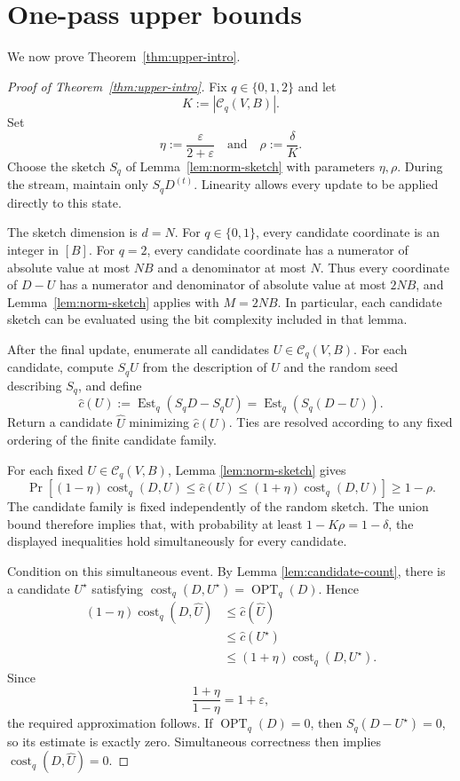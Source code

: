 \documentclass[11pt]{article}
\theoremstyle{definition}
\newcommand{\OPT}{\operatorname{OPT}}
\newcommand{\cost}{\operatorname{cost}}
\newcommand{\Est}{\operatorname{Est}}
\begin{document}
\section{One-pass upper bounds}\label{sec:upper}

We now prove Theorem~\ref{thm:upper-intro}.

\begin{proof}[Proof of Theorem~\ref{thm:upper-intro}]
Fix \(q\in\{0,1,2\}\) and let
\[
 K:=|\mathcal C_q(V,B)|.
\]
Set
\[
 \eta:=\frac{\varepsilon}{2+\varepsilon}
 \quad\text{and}\quad
 \rho:=\frac{\delta}{K}.
\]
Choose the sketch \(S_q\) of Lemma~\ref{lem:norm-sketch} with parameters
\(\eta,\rho\).  During the stream, maintain only \(S_qD^{(t)}\).  Linearity
allows every update to be applied directly to this state.

The sketch dimension is \(d=N\).  For \(q\in\{0,1\}\), every candidate
coordinate is an integer in \([B]\).  For \(q=2\), every candidate coordinate
has a numerator of absolute value at most \(NB\) and a denominator at most
\(N\).  Thus every coordinate of \(D-U\) has a numerator and denominator of
absolute value at most \(2NB\), and Lemma~\ref{lem:norm-sketch} applies with
\(M=2NB\).  In particular, each candidate sketch can be evaluated using the
bit complexity included in that lemma.

After the final update, enumerate all candidates
\(U\in\mathcal C_q(V,B)\).  For each candidate, compute \(S_qU\) from the
description of \(U\) and the random seed describing \(S_q\), and define
\[
 \widehat c(U):=\Est_q(S_qD-S_qU)
               =\Est_q(S_q(D-U)).
\]
Return a candidate \(\widehat U\) minimizing \(\widehat c(U)\).  Ties are
resolved according to any fixed ordering of the finite candidate family.

For each fixed \(U\in\mathcal C_q(V,B)\), Lemma
\ref{lem:norm-sketch} gives
\[
 \Pr\left[
 (1-\eta)\cost_q(D,U)
 \le\widehat c(U)\le
 (1+\eta)\cost_q(D,U)
 \right]\ge1-\rho.
\]
The candidate family is fixed independently of the random sketch.  The union
bound therefore implies that, with probability at least
\(1-K\rho=1-\delta\), the displayed inequalities hold simultaneously for
every candidate.

Condition on this simultaneous event.  By Lemma
\ref{lem:candidate-count}, there is a candidate \(U^\star\) satisfying
\(\cost_q(D,U^\star)=\OPT_q(D)\).  Hence
\begin{align*}
 (1-\eta)\cost_q(D,\widehat U)
 &\le \widehat c(\widehat U)\\
 &\le \widehat c(U^\star)\\
 &\le (1+\eta)\cost_q(D,U^\star).
\end{align*}
Since
\[
 \frac{1+\eta}{1-\eta}=1+\varepsilon,
\]
the required approximation follows.  If \(\OPT_q(D)=0\), then
\(S_q(D-U^\star)=0\), so its estimate is exactly zero.  Simultaneous
correctness then implies \(\cost_q(D,\widehat U)=0\).


\end{proof}
\end{document}
